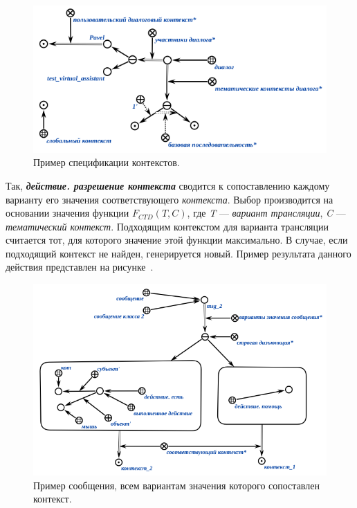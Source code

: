 \begin{figure}[h]
    \centering
    \includegraphics[scale=0.8]{images/part4/chapter_nl_interfaces/user_context}
    \caption{Пример спецификации контекстов.}
    \label{fig:user_context}
\end{figure}

Так, \textbf{\textit{действие. разрешение контекста}} сводится к сопоставлению каждому варианту его значения соответствующего \textit{контекста}.
Выбор производится на основании значения функции \textit{$F_{CTD}(T, C)$}, где \textit{T} --- \textit{вариант трансляции}, \textit{C} --- \textit{тематический контекст}.
Подходящим контекстом для варианта трансляции считается тот, для которого значение этой функции максимально.
В случае, если подходящий контекст не найден, генерируется новый.
Пример результата данного действия представлен на рисунке~\textit{}.

\begin{figure}[h]
    \centering
    \includegraphics[scale=0.8]{images/part4/chapter_nl_interfaces/relevant_contexts}
    \caption{Пример сообщения, всем вариантам значения которого сопоставлен контекст.}
    \label{fig:relevant_contexts}
\end{figure}

